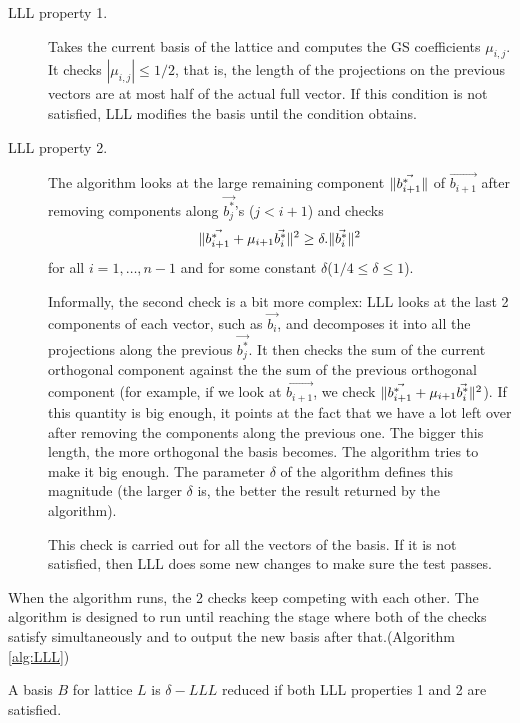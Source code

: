 \begin{description}
\item [LLL property 1.] Takes the current basis of the lattice and computes the
  GS coefficients $\mu_{i,j}$. It checks $|\mu_{i,j}| \leq 1/2$, that is, the
  length of the projections on the previous vectors are at most half of the
  actual full vector. If this condition is not satisfied, LLL modifies the basis
  until the condition obtains.
\item [LLL property 2.] The algorithm looks at the large remaining component
  $\Vert \vec{b_{i+1}^*} \Vert$ of $\vec{b_{i+1}}$ after removing components along
  $\vec{b_j^*}$'s ($j < i + 1$) and checks
  \[
    \Vert \vec{b_{i+1}^*}+\mu_{i+1}\vec{b_i^*} \Vert^2 \geq \delta
    . \Vert \vec{b_i^*} \Vert^2
  \]
  for all $i=1,\dots,n-1$ and for some constant
  $\delta$($1/4 \leq \delta \leq 1$).

  Informally, the second check is a bit more complex: LLL looks at the last 2
  components of each vector, such as $\vec{b_i}$, and decomposes it
  into all the projections along the previous $\vec{b_j^*}$. It then checks the 
  sum of the current orthogonal component against the the sum of the previous orthogonal component (for example, if
  we look at $\vec{b_{i+1}}$, we check
  $\Vert \vec{b_{i+1}^*}+\mu_{i+1}\vec{b_i^*} \Vert^2$). If this quantity is big
  enough, it points at the fact that we have a lot left over after removing the
  components along the previous one. The bigger this length, the more
  orthogonal the basis becomes. The algorithm tries to make it big enough. The
  parameter $\delta$ of the algorithm defines this magnitude (the larger
  $\delta$ is, the better the result returned by the algorithm).

  This check is carried out for all the vectors of the basis. If it is not
  satisfied, then  LLL does some new changes to make sure the test passes.
\end{description}

When the algorithm runs, the 2 checks keep competing with each
other. The algorithm is designed to run until reaching the stage where both of the checks satisfy
simultaneously and to output the new basis after that.(Algorithm
\ref{alg:LLL})
\begin{definition}
  A basis $B$ for lattice $L$ is $\delta-LLL$ reduced if both LLL properties 1
  and 2 are satisfied.
  \label{def:LLL}
\end{definition}

